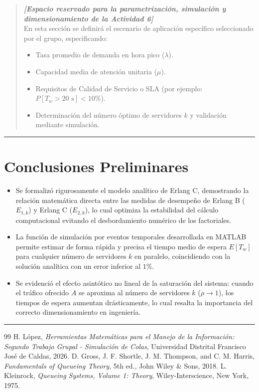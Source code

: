 \documentclass[11pt, a4paper]{article}
\begin{document}
\begin{quote}
\textit{\textbf{[Espacio reservado para la parametrización, simulación y dimensionamiento de la Actividad 6]}}\\
En esta sección se definirá el escenario de aplicación específico seleccionado por el grupo, especificando:
\begin{itemize}
    \item Tasa promedio de demanda en hora pico ($\lambda$).
    \item Capacidad media de atención unitaria ($\mu$).
    \item Requisitos de Calidad de Servicio o SLA (por ejemplo: $P[T_w > 20\text{ s}] < 10\%$).
    \item Determinación del número óptimo de servidores $k$ y validación mediante simulación.
\end{itemize}
\end{quote}

\vspace{1em}
\hrule
\vspace{1em}

\section{Conclusiones Preliminares}
\begin{itemize}
    \item Se formalizó rigurosamente el modelo analítico de Erlang C, demostrando la relación matemática directa entre las medidas de desempeño de Erlang B ($E_{1,k}$) y Erlang C ($E_{2,k}$), lo cual optimiza la estabilidad del cálculo computacional evitando el desbordamiento numérico de los factoriales.
    \item La función de simulación por eventos temporales desarrollada en MATLAB permite estimar de forma rápida y precisa el tiempo medio de espera $E[T_w]$ para cualquier número de servidores $k$ en paralelo, coincidiendo con la solución analítica con un error inferior al $1\%$.
    \item Se evidenció el efecto asintótico no lineal de la saturación del sistema: cuando el tráfico ofrecido $A$ se aproxima al número de servidores $k$ ($\rho \to 1$), los tiempos de espera aumentan drásticamente, lo cual resalta la importancia del correcto dimensionamiento en ingeniería.
\end{itemize}

\vspace{1em}
\hrule
\vspace{1em}

\begin{thebibliography}{99}
 H. López, \textit{Herramientas Matemáticas para el Manejo de la Información: Segundo Trabajo Grupal - Simulación de Colas}, Universidad Distrital Francisco José de Caldas, 2026.
 D. Gross, J. F. Shortle, J. M. Thompson, and C. M. Harris, \textit{Fundamentals of Queueing Theory}, 5th ed., John Wiley \& Sons, 2018.
 L. Kleinrock, \textit{Queueing Systems, Volume 1: Theory}, Wiley-Interscience, New York, 1975.
\end{thebibliography}
\end{document}
